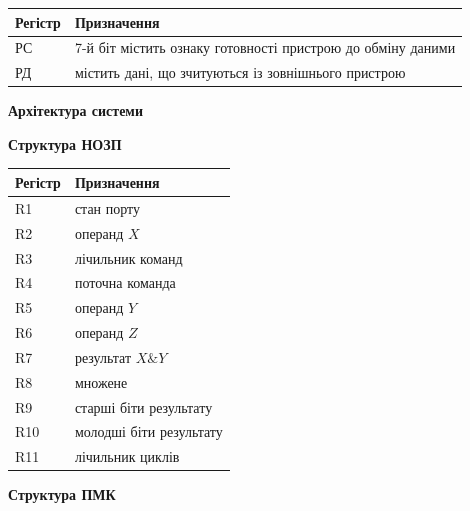 \documentclass[12pt,a4paper]{article}
\newcommand{\sectiontitle}[1]{\begin{center} \textbf{\large #1} \end{center}}
\begin{document}
\begin{center}
\small
\begin{tabular}{|C{1.6cm}|C{10cm}|}
    \hline
    \textbf{Регістр} & \textbf{Призначення} \\
    \hline
    РС & 7-й біт містить ознаку готовності пристрою до обміну даними \\
    \hline
    РД & містить дані, що зчитуються із зовнішнього пристрою \\
    \hline
\end{tabular}
\end{center}
\normalsize

\newpage

\sectiontitle{Архітектура системи}

\begin{center}
\begin{minipage}[t]{0.47\textwidth}
\centering
\textbf{Структура НОЗП}

\vspace{0.4em}
\small
\begin{tabular}{|C{1.8cm}|p{4.5cm}|}
    \hline
    \textbf{Регістр} & \textbf{Призначення} \\
    \hline
    R1 & стан порту \\
    \hline
    R2 & операнд $X$ \\
    \hline
    R3 & лічильник команд \\
    \hline
    R4 & поточна команда \\
    \hline
    R5 & операнд $Y$ \\
    \hline
    R6 & операнд $Z$ \\
    \hline
    R7 & результат $X \& Y$ \\
    \hline
    R8 & множене \\
    \hline
    R9 & старші біти результату \\
    \hline
    R10 & молодші біти результату \\
    \hline
    R11 & лічильник циклів \\
    \hline
\end{tabular}
\end{minipage}
\hfill
\begin{minipage}[t]{0.47\textwidth}
\centering
\textbf{Структура ПМК}


\end{minipage}
\end{center}
\end{document}
